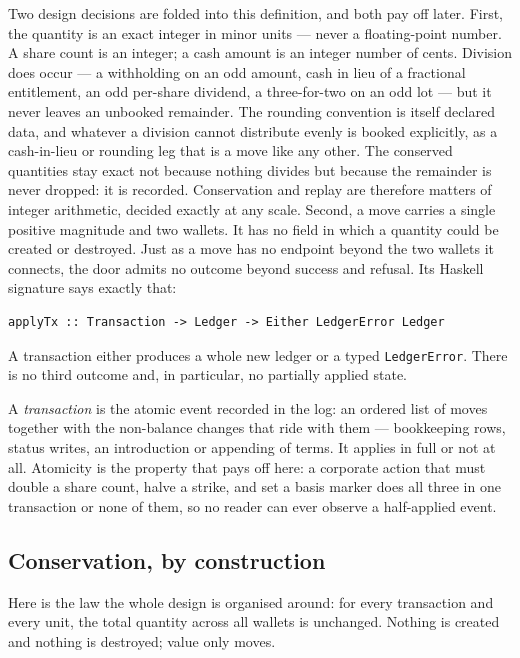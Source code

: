 Two design decisions are folded into this definition, and both pay off later.
First, the quantity is an exact integer in minor units --- never a floating-point
number. A share count is an integer; a cash amount is an integer number of cents.
Division does occur --- a withholding on an odd amount, cash in lieu of a
fractional entitlement, an odd per-share dividend, a three-for-two on an odd lot
--- but it never leaves an unbooked remainder. The rounding convention is itself
declared data, and whatever a division cannot distribute evenly is booked
explicitly, as a cash-in-lieu or rounding leg that is a move like any other. The
conserved quantities stay exact not because nothing divides but because the
remainder is never dropped: it is recorded. Conservation and replay are therefore
matters of integer arithmetic, decided exactly at any scale. Second, a move carries a single positive magnitude and two wallets. It
has no field in which a quantity could be created or destroyed. Just as a move
has no endpoint beyond the two wallets it connects, the door admits no outcome
beyond success and refusal. Its Haskell signature says exactly that:

\begin{lstlisting}
applyTx :: Transaction -> Ledger -> Either LedgerError Ledger
\end{lstlisting}

A transaction either produces a whole new ledger or a typed \texttt{LedgerError}.
There is no third outcome and, in particular, no partially applied state.

A \emph{transaction} is the atomic event recorded in the log: an ordered list of
moves together with the non-balance changes that ride with them --- bookkeeping
rows, status writes, an introduction or appending of terms. It applies in full or
not at all. Atomicity is the property that pays off here: a corporate action that
must double a share count, halve a strike, and set a basis marker does all three
in one transaction or none of them, so no reader can ever observe a
half-applied event.

\subsection{Conservation, by construction}

Here is the law the whole design is organised around: for every transaction and
every unit, the total quantity across all wallets is unchanged. Nothing is created
and nothing is destroyed; value only moves.

